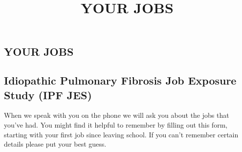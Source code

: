 \documentclass[a4paper,10pt]{article}
\begin{document}
 \newpage\title{\bf YOUR JOBS}
 \date{}
 
 
 \pagestyle{fancy}
 
 
 \begin{centering} 
     \section*{YOUR JOBS}
 \end{centering}

 \subsection*{Idiopathic Pulmonary Fibrosis Job Exposure Study (IPF JES)}

 When we speak with you on the phone we will ask you about the jobs that you've had. You might find it helpful to remember by filling out this form, starting with your first job since leaving school.  If you can’t remember certain details please put your best guess.
\end{document}
